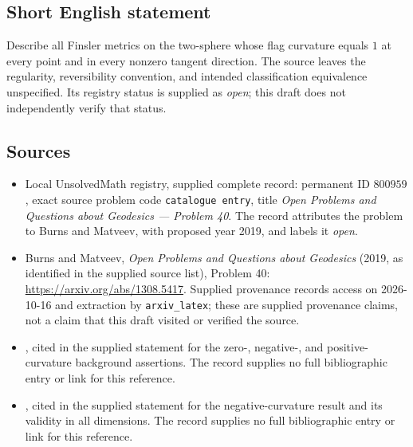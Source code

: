 \documentclass[11pt]{article}
\begin{document}
\subsection{Short English statement}
Describe all Finsler metrics on the two-sphere whose flag curvature equals \(1\) at every point and in every nonzero tangent direction. The source leaves the regularity, reversibility convention, and intended classification equivalence unspecified. Its registry status is supplied as \emph{open}; this draft does not independently verify that status.
\subsection{Sources}
\begin{itemize}
\item Local UnsolvedMath registry, supplied complete record: permanent ID \(800959\), exact source problem code \texttt{catalogue entry}, title \emph{Open Problems and Questions about Geodesics --- Problem 40}. The record attributes the problem to Burns and Matveev, with proposed year 2019, and labels it \emph{open}.
\item Burns and Matveev, \emph{Open Problems and Questions about Geodesics} (2019, as identified in the supplied source list), Problem 40: \url{https://arxiv.org/abs/1308.5417}. Supplied provenance records access on 2026-10-16 and extraction by \texttt{arxiv\_latex}; these are supplied provenance claims, not a claim that this draft visited or verified the source.
\item [Akbar-Zadeh1988], cited in the supplied statement for the zero-, negative-, and positive-curvature background assertions. The record supplies no full bibliographic entry or link for this reference.
\item [Foulon1997], cited in the supplied statement for the negative-curvature result and its validity in all dimensions. The record supplies no full bibliographic entry or link for this reference.
\end{itemize}
\end{document}
